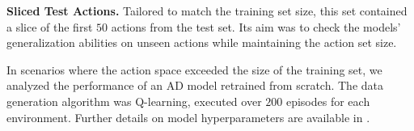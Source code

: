 \textbf{Sliced Test Actions.} Tailored to match the training set size, this set contained a slice of the first $50$ actions from the test set. Its aim was to check the models' generalization abilities on unseen actions while maintaining the action set size.

In scenarios where the action space exceeded the size of the training set, we analyzed the performance of an AD model retrained from scratch. The data generation algorithm was Q-learning, executed over $200$ episodes for each environment. Further details on model hyperparameters are available in .




